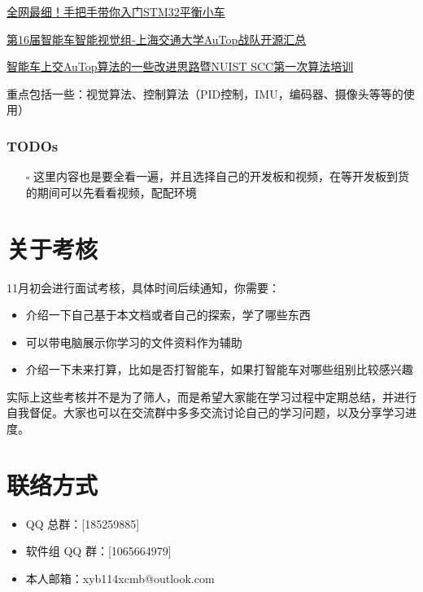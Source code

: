 \documentclass[a4paper,12pt]{article}
\begin{document}
\href{https://www.bilibili.com/video/BV1YWCnYFEyp/}{全网最细！手把手带你入门STM32平衡小车}

\href{https://zhuanlan.zhihu.com/p/391252945}{第16届智能车智能视觉组-上海交通大学AuTop战队开源汇总}

\href{https://www.bilibili.com/video/BV1mY411y76c/}{智能车上交AuTop算法的一些改进思路暨NUIST SCC第一次算法培训}

重点包括一些：视觉算法、控制算法（PID控制，IMU，编码器、摄像头等等的使用）

\subsubsection{TODOs}

\begin{todobox}
\begin{itemize}
    \item[$\square$] 这里内容也是要全看一遍，并且选择自己的开发板和视频，在等开发板到货的期间可以先看看视频，配配环境
\end{itemize}
\end{todobox}

\section{关于考核}

11月初会进行面试考核，具体时间后续通知，你需要：

\begin{itemize}
    \item 介绍一下自己基于本文档或者自己的探索，学了哪些东西
    \item 可以带电脑展示你学习的文件资料作为辅助
    \item 介绍一下未来打算，比如是否打智能车，如果打智能车对哪些组别比较感兴趣
\end{itemize}

实际上这些考核并不是为了筛人，而是希望大家能在学习过程中定期总结，并进行自我督促。大家也可以在交流群中多多交流讨论自己的学习问题，以及分享学习进度。

\section{联络方式}

\begin{itemize}
    \item QQ 总群：[185259885]
    \item 软件组 QQ 群：[1065664979]
    \item 本人邮箱：xyb114xcmb@outlook.com
\end{itemize}
\end{document}
